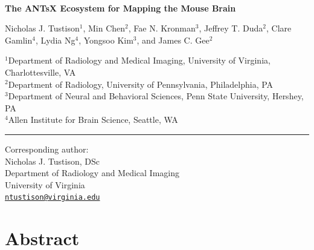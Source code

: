 \documentclass[
  12pt,
]{article}
\author{}
\date{\vspace{-2.5em}}
\begin{document}
\linenumbers
{}


\begin{centering}

$ $

\vspace{6cm}

\LARGE

{\bf The ANTsX Ecosystem for Mapping the Mouse Brain}

\vspace{1.0 cm}

\normalsize

Nicholas J. Tustison$^{1}$,
Min Chen$^{2}$,
Fae N. Kronman$^{3}$,
Jeffrey T. Duda$^{2}$,
Clare Gamlin$^{4}$,
Lydia Ng$^{4}$,
Yongsoo Kim$^{3}$, and
James C. Gee$^{2}$

\small

$^{1}$Department of Radiology and Medical Imaging, University of Virginia, Charlottesville, VA \\
$^{2}$Department of Radiology, University of Pennsylvania, Philadelphia, PA \\
$^{3}$Department of Neural and Behavioral Sciences, Penn State University, Hershey, PA \\
$^{4}$Allen Institute for Brain Science, Seattle, WA \\

\vspace{1.2 cm}

\end{centering}

\vspace{5.5 cm}

\noindent

\rule{4cm}{0.4pt}

\scriptsize

Corresponding author:\\
Nicholas J. Tustison, DSc\\
Department of Radiology and Medical Imaging\\
University of Virginia\\
\href{mailto:ntustison@virginia.edu}{\nolinkurl{ntustison@virginia.edu}}

\normalsize

\newpage


\hypertarget{abstract}{%
\section*{Abstract}\label{abstract}}
\end{document}
